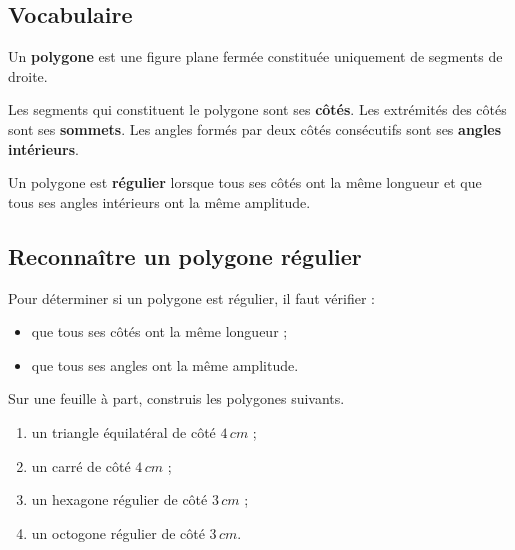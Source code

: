 \documentclass[../../syllabus_1.tex]{subfiles}
\begin{document}
\subsection{Vocabulaire}

Un \textbf{polygone} est une figure plane fermée constituée
uniquement de segments de droite.

Les segments qui constituent le polygone sont ses \textbf{côtés}.
Les extrémités des côtés sont ses \textbf{sommets}.
Les angles formés par deux côtés consécutifs sont ses \textbf{angles
intérieurs}.

Un polygone est \textbf{régulier} lorsque tous ses côtés ont la même
longueur et que tous ses angles intérieurs ont la même amplitude.

\begin{center}
\end{center}

\subsection{Reconnaître un polygone régulier}

Pour déterminer si un polygone est régulier, il faut vérifier :
\begin{itemize}
    \item que tous ses côtés ont la même longueur ;
    \item que tous ses angles ont la même amplitude.
\end{itemize}

\begin{exercise}
    Sur une feuille à part, construis les polygones suivants.
    \begin{enumerate}[cols=2]
        \item un triangle équilatéral de côté $4\,cm$ ;
        \item un carré de côté $4\,cm$ ;
        \item un hexagone régulier de côté $3\,cm$ ;
        \item un octogone régulier de côté $3\,cm$.
    \end{enumerate}
\end{exercise}
\end{document}
